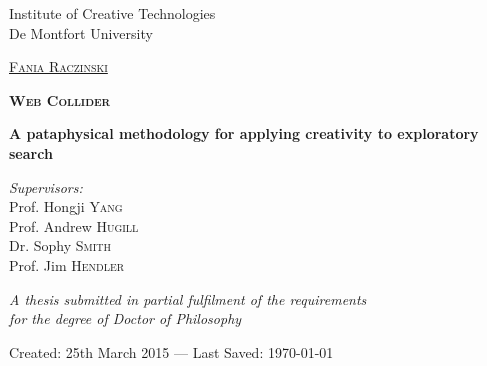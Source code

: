 
\begin{titlepage}
\begin{center}

Institute of Creative Technologies\\
De Montfort University

\vspace{2cm}

\textsc{\huge \href{http://fania.uk}{Fania Raczinski}}

\vspace{2cm}


\textsc{\Huge \bfseries Web Collider}

\vspace{1.5cm}

{\huge \bfseries A pataphysical methodology for applying creativity to exploratory search}

\vspace{2cm}

\emph{Supervisors:}\\
{Prof. Hongji \textsc{Yang}}\\
{Prof. Andrew \textsc{Hugill}}\\
{Dr. Sophy \textsc{Smith}}\\
{Prof. Jim \textsc{Hendler}}

\vspace{1.5cm}

\large \textit{A thesis submitted in partial fulfilment of the requirements\\ for the degree of Doctor of Philosophy}

\vfill

Created: {25th March 2015} --- Last Saved: {\today}\\

\end{center}
\end{titlepage}
